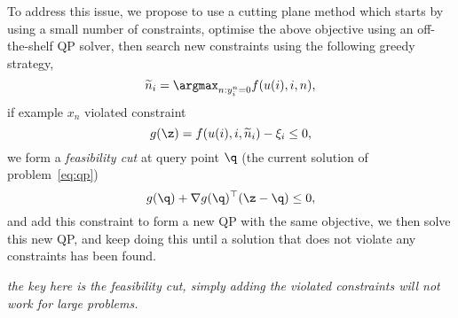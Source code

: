 To address this issue, we propose to use a cutting plane method which starts by using a small number of constraints,
optimise the above objective using an off-the-shelf QP solver,
then search new constraints using the following greedy strategy,
\begin{equation*}
\widetilde n_i = \argmax_{n: y_i^n=0} f(u(i), i, n),
\end{equation*}
if example $x_n$ violated constraint
\begin{equation*}
g(\z) = f(u(i), i, \widetilde n_i) - \xi_i \le 0,
\end{equation*}
we form a \emph{feasibility cut} at query point $\q$ (\ie the current solution of problem~\ref{eq:qp})
$$
g(\q) + \nabla g(\q)^\top (\z - \q) \le 0,
$$
and add this constraint to form a new QP with the same objective,
we then solve this new QP, and keep doing this until a solution that does not violate any constraints has been found.

{\it the key here is the feasibility cut, simply adding the violated constraints will not work for large problems.}
